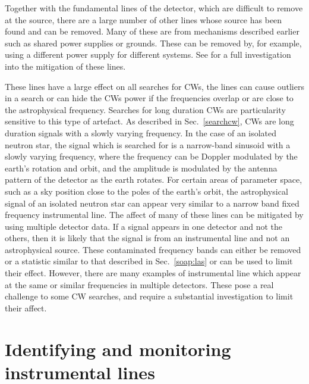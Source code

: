 Together with the fundamental lines of the detector, which are difficult to remove at the source, there are a large number of other lines whose source has been found and can be removed.  
Many of these are from mechanisms described
earlier such as shared power supplies or grounds. These can be removed by, for
example, using a different power supply for different systems. See
\citep{covas2018IdentificationMitigation} for a full investigation into the
mitigation of these lines.

%

These lines have a large effect on all searches for \glspl{CW}, the lines can cause outliers in a search or can hide the \glspl{CW} power if the frequencies overlap or are close to the astrophysical frequency.
Searches for long duration \glspl{CW} are particularity sensitive to this type of artefact.  As described in
Sec.~\ref{searchcw}, \glspl{CW} are long duration signals with a slowly varying
frequency.  In the case of an isolated neutron star, the signal which is
searched for is a narrow-band sinusoid with a slowly varying frequency, where the frequency can be Doppler modulated by
the earth's rotation and orbit, and the amplitude is modulated by the antenna pattern of the detector as the earth rotates. For certain areas of parameter space, such as a sky position
close to the poles of the earth's orbit, the astrophysical signal of an isolated neutron star can
appear very similar to a narrow band fixed frequency instrumental line. The affect of many of these lines can be mitigated by using multiple detector data. If a signal
appears in one detector and not the others, then it is likely that the signal
is from an instrumental line and not an astrophysical source.  These
contaminated frequency bands can either be removed or a statistic similar to
that described in Sec.~\ref{soap:las} or \citep{keitel2014SearchContinuous} can
be used to limit their effect.  However, there are many examples of
instrumental line which appear at the same or similar frequencies in multiple
detectors.  These pose a real challenge to some \gls{CW} searches, and require
a substantial investigation to limit their affect.

\section{\label{detchar:monitor}Identifying and monitoring instrumental lines}
%


